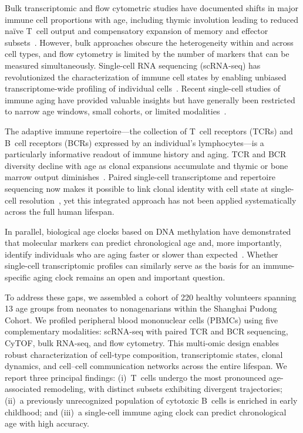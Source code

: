 \documentclass[11pt]{article}
\begin{document}
Bulk transcriptomic and flow cytometric studies have documented shifts in major immune cell proportions with age, including thymic involution leading to reduced na\"ive T~cell output and compensatory expansion of memory and effector subsets~\citep{goronzy2013understanding}. However, bulk approaches obscure the heterogeneity within and across cell types, and flow cytometry is limited by the number of markers that can be measured simultaneously. Single-cell RNA sequencing (scRNA-seq) has revolutionized the characterization of immune cell states by enabling unbiased transcriptome-wide profiling of individual cells~\citep{zheng2017massively,satija2015spatial}. Recent single-cell studies of immune aging have provided valuable insights but have generally been restricted to narrow age windows, small cohorts, or limited modalities~\citep{hashimoto2019single,mogilenko2021immune}.

The adaptive immune repertoire---the collection of T~cell receptors (TCRs) and B~cell receptors (BCRs) expressed by an individual's lymphocytes---is a particularly informative readout of immune history and aging. TCR and BCR diversity decline with age as clonal expansions accumulate and thymic or bone marrow output diminishes~\citep{qi2014diversity,britanova2014age}. Paired single-cell transcriptome and repertoire sequencing now makes it possible to link clonal identity with cell state at single-cell resolution~\citep{stubbington2017tcell,de2018clonotypes}, yet this integrated approach has not been applied systematically across the full human lifespan.

In parallel, biological age clocks based on DNA methylation have demonstrated that molecular markers can predict chronological age and, more importantly, identify individuals who are aging faster or slower than expected~\citep{horvath2013dna,hannum2013genome}. Whether single-cell transcriptomic profiles can similarly serve as the basis for an immune-specific aging clock remains an open and important question.

To address these gaps, we assembled a cohort of 220 healthy volunteers spanning 13 age groups from neonates to nonagenarians within the Shanghai Pudong Cohort. We profiled peripheral blood mononuclear cells (PBMCs) using five complementary modalities: scRNA-seq with paired TCR and BCR sequencing, CyTOF, bulk RNA-seq, and flow cytometry. This multi-omic design enables robust characterization of cell-type composition, transcriptomic states, clonal dynamics, and cell--cell communication networks across the entire lifespan. We report three principal findings: (i)~T~cells undergo the most pronounced age-associated remodeling, with distinct subsets exhibiting divergent trajectories; (ii)~a previously unrecognized population of cytotoxic B~cells is enriched in early childhood; and (iii)~a single-cell immune aging clock can predict chronological age with high accuracy.
\end{document}

